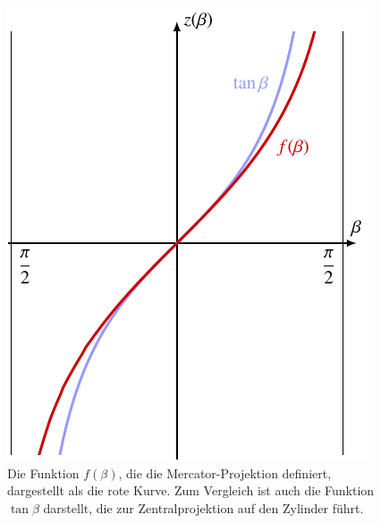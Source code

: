 %
%
%
\begin{figure}
\centering
\includegraphics{chapters/030-kurvenintegral/images/mercator.pdf}
\caption{Die Funktion $f(\beta)$, die die Mercator-Projektion definiert,
dargestellt als die {\color{darkred}rote} Kurve.
Zum Vergleich ist auch die Funktion $\tan\beta$ darstellt, die zur
Zentralprojektion auf den Zylinder führt.
\label{buch:kurvenintegral:fig:mercator}}
\end{figure}
